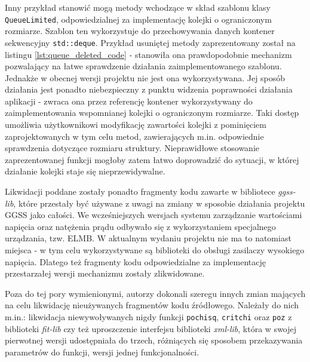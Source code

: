 


Inny przykład stanowić mogą metody wchodzące w skład szablonu klasy \lstinline{QueueLimited}, odpowiedzialnej za implementację kolejki o ograniczonym rozmiarze. Szablon ten wykorzystuje do przechowywania danych kontener sekwencyjny \lstinline{std::deque}. Przykład usuniętej metody zaprezentowany został na listingu \ref{lst:queue_deleted_code} - stanowiła ona prawdopodobnie mechanizm pozwalający na łatwe sprawdzenie działania zaimplementowanego szablonu. Jednakże w obecnej wersji projektu nie jest ona wykorzystywana. Jej sposób działania jest ponadto niebezpieczny z punktu widzenia poprawności działania aplikacji - zwraca ona przez referencję kontener wykorzystywany do zaimplementowania wspomnianej kolejki o ograniczonym rozmiarze. Taki dostęp umożliwia użytkownikowi modyfikację zawartości kolejki z pominięciem zaprojektowanych w tym celu metod, zawierających m.in. odpowiednie sprawdzenia dotyczące rozmiaru struktury. Nieprawidłowe stosowanie zaprezentowanej funkcji mogłoby zatem łatwo doprowadzić do sytuacji, w której działanie kolejki staje się nieprzewidywalne. 



Likwidacji poddane zostały ponadto fragmenty kodu zawarte w bibliotece \emph{ggss-lib}, które przestały być używane z uwagi na zmiany w sposobie działania projektu GGSS jako całości. We wcześniejszych wersjach systemu zarządzanie wartościami napięcia oraz natężenia prądu odbywało się z wykorzystaniem specjalnego urządzania, tzw. ELMB. W aktualnym wydaniu projektu nie ma to natomiast miejsca - w tym celu wykorzystywane są biblioteki do obsługi zasilaczy wysokiego napięcia. Dlatego też fragmenty kodu odpowiedzialne za implementację przestarzałej wersji mechanizmu zostały zlikwidowane.

Poza do tej pory wymienionymi, autorzy dokonali szeregu innych zmian mających na celu likwidację nieużywanych fragmentów kodu źródłowego. Należały do nich m.in.: likwidacja niewywoływanych nigdy funkcji \lstinline{pochisq}, \lstinline{critchi} oraz \lstinline{poz} z biblioteki \emph{fit-lib} czy też uproszczenie interfejsu biblioteki \emph{xml-lib}, która w swojej pierwotnej wersji udostępniała do trzech, różniących się sposobem przekazywania parametrów do funkcji, wersji jednej funkcjonalności.


